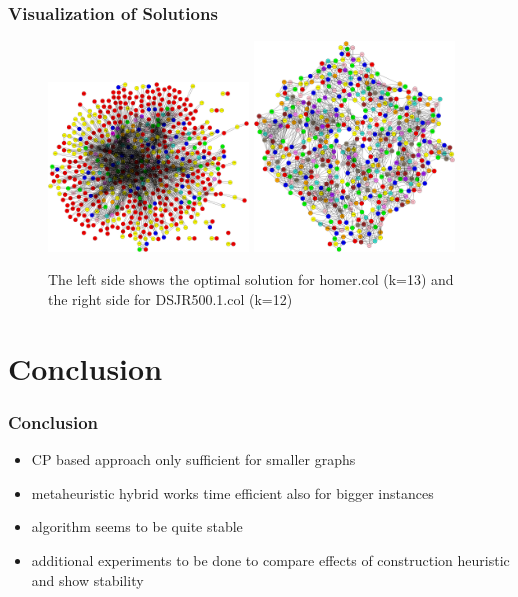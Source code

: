 \documentclass{beamer}
\begin{document}
\begin{frame}
  \frametitle{Visualization of Solutions}

  \begin{figure}
    \footnotesize
   \includegraphics[width=0.475\textwidth]{homer.png}
   \hfill
   \includegraphics[width=0.475\textwidth]{DSJR500.png}
   \caption{The left side shows the optimal solution for homer.col (k=13) and the right side for DSJR500.1.col (k=12)}
   \label{figure1}
\end{figure}

\end{frame}


  \section{Conclusion}
  \begin{frame}
    \frametitle{Conclusion}

    \begin{itemize}
    \item CP based approach only sufficient for smaller graphs
    \item metaheuristic hybrid works time efficient also for bigger instances
    \item algorithm seems to be quite stable
    \item additional experiments to be done to compare effects of construction heuristic and show stability


    \end{itemize}

  \end{frame}
\end{document}
